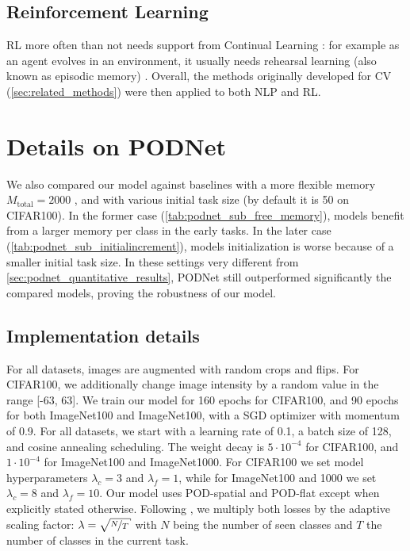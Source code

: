 \subsection{Reinforcement Learning}
\label{sec:related_rl}


\ac{RL} \citep{sutton1998rl} more often than not needs support from Continual Learning
\citep{khetarpal2020continualrl}: for example as an agent evolves in an environment, it usually
needs rehearsal learning (also known as episodic memory) \citep{mnih2013atarirl}. Overall, the
methods originally developed for \ac{CV} (\autoref{sec:related_methods}) were then applied to both
\ac{NLP} and \ac{RL}.


\section{Details on PODNet}
\label{sec:appendix_podnet}

We also compared our model against baselines with a more flexible memory $M_{\text{total}} = 2000$
\citep{rebuffi2017icarl,wu2019bias_correction}, and with various initial task size (by default it is
50 on CIFAR100). In the former case (\autoref{tab:podnet_sub_free_memory}), models benefit from a
larger memory per class in the early tasks. In the later case
(\autoref{tab:podnet_sub_initialincrement}), models initialization is worse because of a smaller
initial task size. In these settings very different from \autoref{sec:podnet_quantitative_results},
\ac{PODNet} still outperformed significantly the compared models, proving the robustness of our
model.




\subsection{Implementation details}

For all datasets, images are augmented with random crops and flips. For CIFAR100, we additionally
change image intensity by a random value in the range [-63, 63].
%
We train our model for 160 epochs for CIFAR100, and 90 epochs for both ImageNet100 and ImageNet100,
with a SGD optimizer with momentum of 0.9. For all datasets, we start with a learning rate of 0.1, a
batch size of 128, and cosine annealing scheduling.
%
The weight decay is $5\cdot 10^{-4}$ for CIFAR100, and $1\cdot 10^{-4}$ for ImageNet100 and
ImageNet1000. For CIFAR100 we set model hyperparameters $\lambda_c = 3$ and $\lambda_f=1$, while for
ImageNet100 and 1000 we set $\lambda_c = 8$ and $\lambda_f =10$. Our model uses POD-spatial and
POD-flat except when explicitly stated otherwise. Following \citet{hou2019ucir}, we multiply both
losses by the adaptive scaling factor: $\lambda=\sqrt{\nicefrac{N}{T}}$ with $N$ being the number of
seen classes and $T$ the number of classes in the current task.

